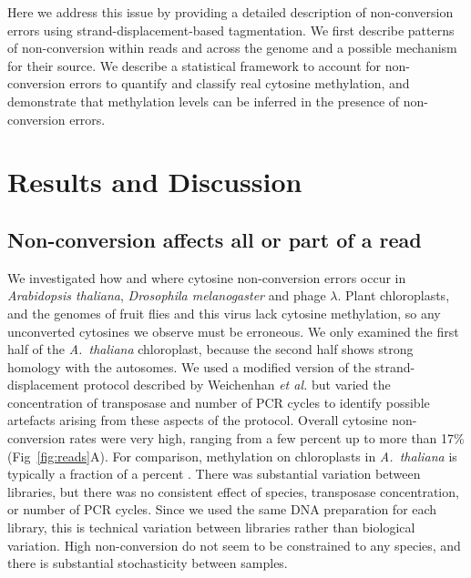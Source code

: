 \documentclass[10pt,letterpaper]{article}
\begin{document}
Here we address this issue by providing a detailed description of non-conversion errors using strand-displacement-based tagmentation.
We first describe patterns of non-conversion within reads and across the genome and a possible mechanism for their source.
We describe a statistical framework to account for non-conversion errors to quantify and classify real cytosine methylation, and demonstrate that methylation levels can be inferred in the presence of non-conversion errors.

\section*{Results and Discussion}

\subsection*{Non-conversion affects all or part of a read}

We investigated how and where cytosine non-conversion errors occur in \textit{Arabidopsis thaliana}, \textit{Drosophila melanogaster} and phage $\lambda$.
Plant chloroplasts, and the genomes of fruit flies and this virus lack cytosine methylation, so any unconverted cytosines we observe must be erroneous.
We only examined the first half of the \textit{A.~thaliana} chloroplast, because the second half shows strong homology with the autosomes.
We used a modified version of the strand-displacement protocol described by Weichenhan \textit{et al.} \cite{weichenhan2019generation} but varied the concentration of transposase and number of PCR cycles to identify possible artefacts arising from these aspects of the protocol.
Overall cytosine non-conversion rates were very high, ranging from a few percent up to more than 17\% (Fig~\ref{fig:reads}A).
For comparison, methylation on chloroplasts in \textit{A.~thaliana} is typically a fraction of a percent \cite{zhang2018large}.
There was substantial variation between libraries, but there was no consistent effect of species, transposase concentration, or number of PCR cycles.
Since we used the same DNA preparation for each library, this is technical variation between libraries rather than biological variation.
High non-conversion do not seem to be constrained to any species, and there is substantial stochasticity between samples.
\end{document}
